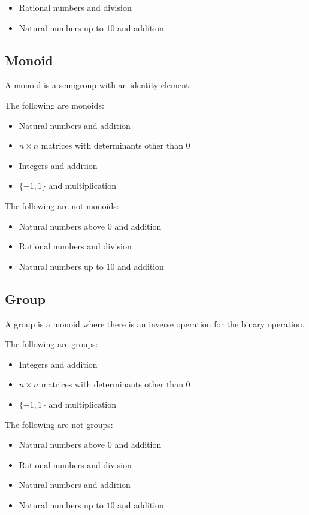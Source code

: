 \begin{itemize}
\item Rational numbers and division
\item Natural numbers up to \(10\) and addition
\end{itemize}

\subsection{Monoid}

A monoid is a semigroup with an identity element.

The following are monoids:

\begin{itemize}
\item Natural numbers and addition
\item \(n\times n\) matrices with determinants other than \(0\)
\item Integers and addition
\item \(\{-1, 1\}\) and multiplication
\end{itemize}

The following are not monoids:

\begin{itemize}
\item Natural numbers above \(0\) and addition
\item Rational numbers and division
\item Natural numbers up to \(10\) and addition
\end{itemize}

\subsection{Group}

A group is a monoid where there is an inverse operation for the binary operation.

The following are groups:

\begin{itemize}
\item Integers and addition
\item \(n\times n\) matrices with determinants other than \(0\)
\item \(\{-1, 1\}\) and multiplication
\end{itemize}

The following are not groups:

\begin{itemize}
\item Natural numbers above \(0\) and addition
\item Rational numbers and division
\item Natural numbers and addition
\item Natural numbers up to \(10\) and addition
\end{itemize}

